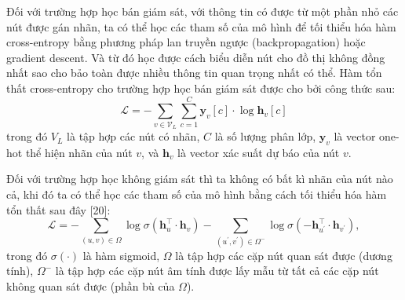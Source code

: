Đối với trường hợp học bán giám sát, với thông tin có được từ một phần nhỏ các nút được gán nhãn, ta có thể học các tham số của mô hình để tối thiểu hóa hàm cross-entropy bằng phương pháp lan truyền ngược (backpropagation) hoặc gradient descent. Và từ đó học được cách biểu diễn nút cho đồ thị không đồng nhất sao cho bảo toàn được nhiều thông tin quan trọng nhất có thể. Hàm tổn thất cross-entropy cho trường hợp học bán giám sát được cho bởi công thức sau:
\begin{equation}
    \mathcal{L}=-\sum_{v \in \mathcal{V}_{L}} \sum_{c=1}^{C} \mathbf{y}_{v}[c] \cdot \log \mathbf{h}_{v}[c]
\end{equation}
trong đó $V_{L}$ là tập hợp các nút có nhãn, $C$ là số lượng phân lớp, $\mathbf{y}_{v}$ là vector one-hot thể hiện nhãn của nút $v$, và $\mathbf{h}_{v}$ là vector xác suất dự báo của nút $v$.

Đối với trường hợp học không giám sát thì ta không có bất kì nhãn của nút nào cả, khi đó ta có thể học các tham số của mô hình bằng cách tối thiểu hóa hàm tổn thất sau đây [20]:
\begin{equation}
    \mathcal{L}=-\sum_{(u, v) \in \Omega} \log \sigma\left(\mathbf{h}_{u}^{\top} \cdot \mathbf{h}_{v}\right)-\sum_{\left(u^{\prime}, v^{\prime}\right) \in \Omega^{-}} \log \sigma\left(-\mathbf{h}_{u^{\prime}}^{\top} \cdot \mathbf{h}_{v^{\prime}}\right),
\end{equation}
trong đó $\sigma(\cdot)$ là hàm sigmoid, $\Omega$ là tập hợp các cặp nút quan sát được (dương tính), $\Omega^{-}$ là tập hợp các cặp nút âm tính được lấy mẫu từ tất cả các cặp nút không quan sát được (phần bù của $\Omega$).
